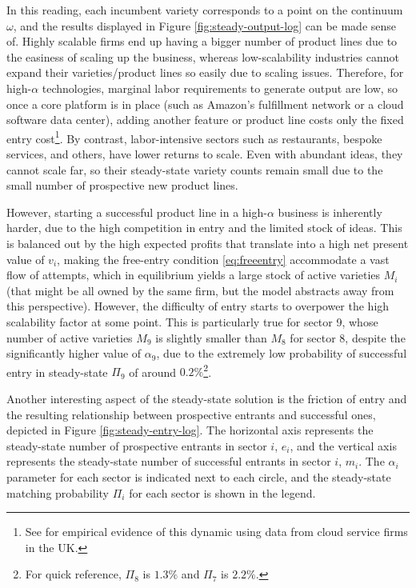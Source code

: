 \documentclass[a4paper,12pt]{article} %
\numberwithin{equation}{section} %
\numberwithin{figure}{section}
\numberwithin{table}{section}
\begin{document}
In this reading, each incumbent variety corresponds to a point on the continuum $\omega$, and the results displayed in 
Figure \ref{fig:steady-output-log} can be made sense of. Highly scalable firms end up having a bigger number of product lines due to the
easiness of scaling up the business, whereas low-scalability industries cannot expand their varieties/product lines so easily due 
to scaling issues. Therefore, for high-$\alpha$ technologies, marginal labor requirements to generate output are low, so once a 
core platform is in place (such as Amazon's fulfillment network or a cloud software data center), adding another feature or product line costs
only the fixed entry cost\footnote{See \textcite{destefano2023cloud} for empirical evidence of this dynamic using data from cloud 
service firms in the UK.}.
By contrast, labor-intensive sectors such as restaurants, bespoke services, and others, have lower returns to scale. Even with abundant ideas,
they cannot scale far, so their steady-state variety counts remain small due to the small number of prospective new product lines.

However, starting a successful product line in a high-$\alpha$ business is inherently harder, due to the high competition in entry and the 
limited stock of ideas. This is balanced out by the high expected profits that translate into a high net present value of $v_i$,
making the free-entry condition \eqref{eq:freeentry} accommodate a vast flow of attempts, which in equilibrium yields a large stock
of active varieties $M_i$ (that might be all owned by the same firm, but the model abstracts away from this perspective). However, the difficulty of
entry starts to overpower the high scalability factor at some point. This is particularly true for sector 9, whose number of active varieties $M_9$ is slightly
smaller than $M_8$ for sector 8, despite the significantly higher value of $\alpha_9$, due to the extremely low probability of successful entry in 
steady-state $\Pi_9$ of around $0.2\%$\footnote{For quick reference, $\Pi_8$ is $1.3\%$ and $\Pi_7$ is $2.2\%$.}.

Another interesting aspect of the steady-state solution is the friction of entry and the resulting relationship 
between prospective entrants and successful ones, depicted in Figure \ref{fig:steady-entry-log}. 
The horizontal axis represents the steady-state number of prospective
entrants in sector $i$, $e_i$, and the vertical axis represents the steady-state number of successful entrants in sector $i$, $m_i$. The $\alpha_i$
parameter for each sector is indicated next to each circle, and the steady-state matching probability $\Pi_i$ for each sector is shown 
in the legend.
\end{document}
